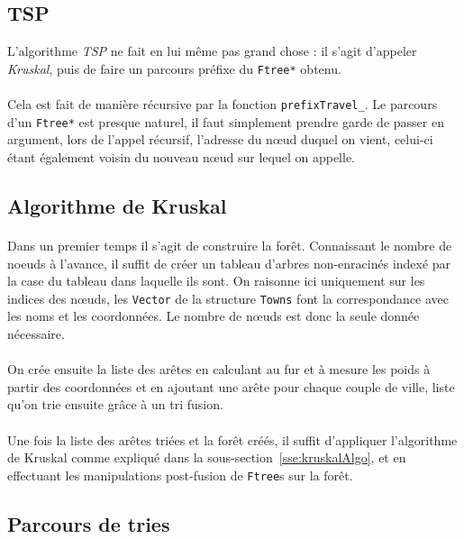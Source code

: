 \documentclass[a4paper]{article}
\begin{document}
\subsection{TSP}
L'algorithme \emph{TSP} ne fait en lui même pas grand chose : il s'agit d'appeler \emph{Kruskal}, puis de faire un parcours préfixe du \texttt{Ftree*} obtenu.

\paragraph*{}
Cela est fait de manière récursive par la fonction \texttt{prefixTravel\_}. Le parcours d'un \texttt{Ftree*} est presque naturel, il faut simplement prendre garde de passer en argument, lors de l'appel récursif, l'adresse du nœud duquel on vient, celui-ci étant également voisin du nouveau nœud sur lequel on appelle.

\subsection{Algorithme de Kruskal}

\paragraph*{}
Dans un premier temps il s'agit de construire la forêt. Connaissant le nombre de noeuds à l'avance, il suffit de créer un tableau d'arbres non-enracinés indexé par la case du tableau dans laquelle ils sont. On raisonne ici uniquement sur les indices des nœuds, les \texttt{Vector} de la structure \texttt{Towns} font la correspondance avec les noms et les coordonnées. Le nombre de nœuds est donc la seule donnée nécessaire.
\paragraph*{}
On crée ensuite la liste des arêtes en calculant au fur et à mesure les poids à partir des coordonnées et en ajoutant une arête pour chaque couple de ville, liste qu'on trie ensuite grâce à un tri fusion.
\paragraph*{}
Une fois la liste des arêtes triées et la forêt créés, il suffit d'appliquer l'algorithme de Kruskal comme expliqué dans la sous-section~\ref{sse:kruskalAlgo}, et en effectuant les manipulations post-fusion de \texttt{Ftree}s sur la forêt.

\subsection{Parcours de tries}
\end{document}

